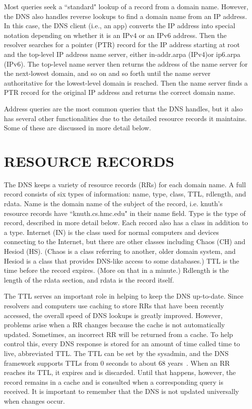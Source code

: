 \documentclass[11pt,a4paper]{article}
\begin{document}
Most queries seek a ``standard" lookup of a record from a domain name. 
However, the DNS also handles reverse lookups to find a domain name from an IP address.
In this case, the DNS client (i.e., an app) converts the IP address into special notation depending on whether it is an IPv4 or an IPv6 address. 
Then the resolver searches for a pointer (PTR) record for the IP address starting at root and the top-level IP address name server, either in-addr.arpa (IPv4)or ip6.arpa (IPv6).
The top-level name server then returns the address of the name server for the next-lowest domain, and so on and so forth until the name server authoritative for the lowest-level domain is reached.
Then the name server finds a PTR record for the original IP address and returns the correct domain name.

Address queries are the most common queries that the DNS handles, but it also has several other functionalities due to the detailed resource records it maintains.
Some of these are discussed in more detail below. 


\section{RESOURCE RECORDS}
\indent\indent The DNS keeps a variety of resource records (RRs) for each domain name. 
A full record consists of six types of information: name, type, class, TTL, rdlength, and rdata. 
Name is the domain name of the subject of the record, i.e. knuth's resource records have ``knuth.cs.hmc.edu" in their name field. 
Type is the type of record, described in more detail below.
Each record also has a class in addition to a type.  
Internet (IN) is the class used for normal computers and devices connecting to the Internet, but there are other classes including Chaos (CH) and Hesiod (HS).
(Chaos is a class referring to another, older domain system, and Hesiod is a class that provides DNS-like access to some databases.)
TTL is the time before the record expires. (More on that in a minute.)
Rdlength is the length of the rdata section, and rdata is the record itself.

The TTL serves an important role in helping to keep the DNS up-to-date.
Since resolvers and computers use caching to store RRs that have been recently accessed, the overall speed of DNS lookups is greatly improved. 
However, problems arise when a RR changes because the cache is not automatically updated. 
Sometimes, an incorrect RR will be returned from a cache. 
To help control this, every DNS response is stored for an amount of time called time to live, abbreviated TTL. 
The TTL can be set by the sysadmin, and the DNS framework supports TTLs from 0 seconds to about 68 years~\cite{DNS}. 
When an RR reaches its TTL, it expires and is discarded. 
Until that happens, however, the record remains in a cache and is consulted when a corresponding query is received. 
It is important to remember that the DNS is not updated universally when changes occur.
\end{document}
